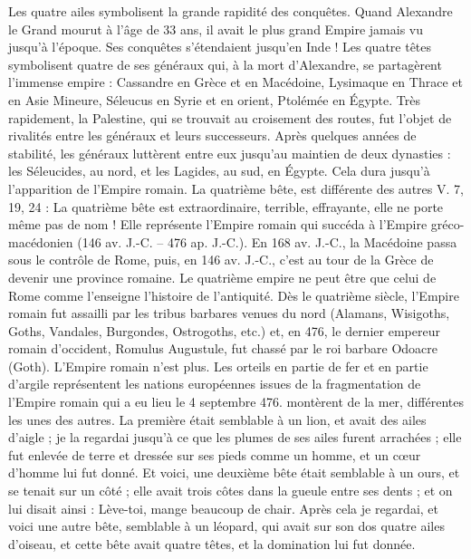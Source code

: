 \begin{multicols}{2}
{Les quatre ailes symbolisent la grande rapidité des conquêtes. Quand Alexandre le Grand mourut à l'âge de 33 ans, il avait le plus grand Empire jamais vu jusqu'à l'époque. Ses conquêtes s'étendaient jusqu'en Inde !
Les quatre têtes symbolisent quatre de ses généraux qui, à la mort d'Alexandre, se partagèrent l'immense empire : Cassandre en Grèce et en Macédoine, Lysimaque en Thrace et en Asie Mineure, Séleucus en Syrie et en orient, Ptolémée en Égypte.
Très rapidement, la Palestine, qui se trouvait au croisement des routes, fut l'objet de rivalités entre les généraux et leurs successeurs. Après quelques années de stabilité, les généraux luttèrent entre eux jusqu'au maintien de deux dynasties : les Séleucides, au nord, et les Lagides, au sud, en Égypte. Cela dura jusqu'à l'apparition de l'Empire romain.
La quatrième bête, est différente des autres
V. 7, 19, 24 : La quatrième bête est extraordinaire, terrible, effrayante, elle ne porte même pas de nom ! Elle représente l'Empire romain qui succéda à l'Empire gréco-macédonien (146 av. J.-C. – 476 ap. J.-C.). En 168 av. J.-C., la Macédoine passa sous le contrôle de Rome, puis, en 146 av. J.-C., c'est au tour de la Grèce de devenir une province romaine.
 Le quatrième empire ne peut être que celui de Rome comme l'enseigne l'histoire de l'antiquité. 
Dès le quatrième siècle, l'Empire romain fut assailli par les tribus barbares venues du nord (Alamans, Wisigoths, Goths, Vandales, Burgondes, Ostrogoths, etc.) et, en 476, le dernier empereur romain d'occident, Romulus Augustule, fut chassé par le roi barbare Odoacre (Goth). L'Empire romain n'est plus.
Les orteils en partie de fer et en partie d'argile représentent les nations européennes issues de la fragmentation de l'Empire romain qui a eu lieu le 4 septembre 476.} montèrent de la mer, différentes les unes des autres.
La première était semblable à un lion, et avait des ailes d'aigle ; je la regardai jusqu'à ce que les plumes de ses ailes furent arrachées ; elle fut enlevée de terre et dressée sur ses pieds comme un homme, et un cœur d'homme lui fut donné.
Et voici, une deuxième bête était semblable à un ours, et se tenait sur un côté ; elle avait trois côtes dans la gueule entre ses dents ; et on lui disait ainsi : Lève-toi, mange beaucoup de chair.
Après cela je regardai, et voici une autre bête, semblable à un léopard, qui avait sur son dos quatre ailes d'oiseau, et cette bête avait quatre têtes, et la domination lui fut donnée.

\end{multicols}
